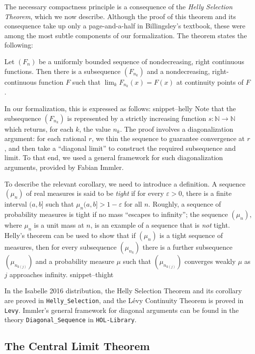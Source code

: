 \documentclass{svjour3}
\newcommand{\NN}{\mathbb{N}}
\newcommand{\Snippet}[1]{\csname snippet--#1\endcsname}
\begin{document}
The necessary compactness principle is a consequence of the \emph{Helly Selection Theorem}, which we now describe. Although the proof of this theorem and its consequence take up only a page-and-a-half in Billingsley's textbook, these were among the most subtle components of our formalization. The theorem states the following:
\begin{theorem}
Let $(F_n)$ be a uniformly bounded sequence of nondecreasing, right continuous functions. Then there is a subsequence $(F_{n_k})$ and a nondecreasing, right-continuous function $F$ such that $\lim_k F_{n_k}(x) = F(x)$ at continuity points of $F$.  
\end{theorem}
In our formalization, this is expressed as follows:
\Snippet{helly}
Note that the subsequence $(F_{n_k})$ is represented by a strictly increasing function $s : \NN \to \NN$ which returns, for each $k$, the value $n_k$. The proof involves a diagonalization argument: for each rational $r$, we thin the sequence to guarantee convergence at $r$, and then take a ``diagonal limit'' to construct the required subsequence and limit. To that end, we used a general framework for such diagonalization arguments, provided by Fabian Immler.

To describe the relevant corollary, we need to introduce a definition. A sequence $(\mu_n)$ of real measures is said to be \emph{tight} if for every $\varepsilon > 0$, there is a finite interval $(a, b]$ such that $\mu_n(a, b] > 1 - \varepsilon$ for all $n$. Roughly, a sequence of probability measures is tight if no mass ``escapes to infinity''; the sequence $(\mu_n)$, where $\mu_n$ is a unit mass at $n$, is an example of a sequence that is \emph{not} tight. Helly's theorem can be used to show that if $(\mu_n)$ is a tight sequence of measures, then for every subsequence $(\mu_{n_k})$ there is a further subsequence $(\mu_{n_{k(j)}})$ and a probability measure $\mu$ such that $(\mu_{n_{k(j)}})$ converges weakly $\mu$ as $j$ approaches infinity.
\Snippet{thight}

In the Isabelle 2016 distribution, the Helly Selection Theorem and its corollary are proved in \texttt{Helly\_Selection}, and the L\'evy Continuity Theorem is proved in \texttt{Levy}. Immler's general framework for diagonal arguments can be found in the theory \texttt{Diagonal\_Sequence} in \texttt{HOL-Library}.

\subsection{The Central Limit Theorem}
\end{document}
